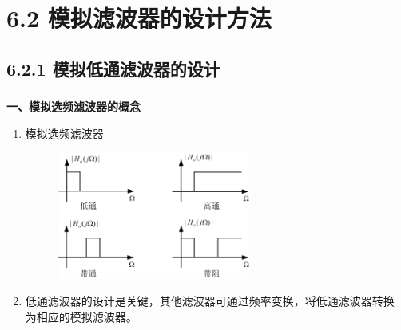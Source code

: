 \documentclass[notheorems,compress,mathserif,table]{beamer}
\begin{document}
\section{6.2 模拟滤波器的设计方法}
\subsection{6.2.1 模拟低通滤波器的设计}
\begin{frame}\frametitle{}%
\textbf{一、模拟选频滤波器的概念}
\begin{enumerate}
       \item 模拟选频滤波器
        \begin{figure}[h]
            \centering
        \includegraphics[width=0.6\textwidth]{fig5_mndtgtdtdz.jpg}
        \end{figure}
       \item
       低通滤波器的设计是关键，其他滤波器可通过频率变换，将低通滤波器转换
       为相应的模拟滤波器。
\end{enumerate}
\end{frame}
\end{document}
